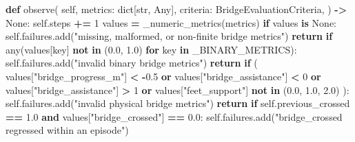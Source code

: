 \documentclass[
  american,
  11pt,
  letterpaper,
]{article}
\newenvironment{Shaded}{\begin{snugshade}}{\end{snugshade}}
\newcommand{\BuiltInTok}[1]{#1}
\newcommand{\ControlFlowTok}[1]{\textcolor[rgb]{0.13,0.29,0.53}{\textbf{#1}}}
\newcommand{\DecValTok}[1]{\textcolor[rgb]{0.00,0.00,0.81}{#1}}
\newcommand{\FloatTok}[1]{\textcolor[rgb]{0.00,0.00,0.81}{#1}}
\newcommand{\KeywordTok}[1]{\textcolor[rgb]{0.13,0.29,0.53}{\textbf{#1}}}
\newcommand{\NormalTok}[1]{#1}
\newcommand{\OperatorTok}[1]{\textcolor[rgb]{0.81,0.36,0.00}{\textbf{#1}}}
\newcommand{\StringTok}[1]{\textcolor[rgb]{0.31,0.60,0.02}{#1}}
\newcommand{\VariableTok}[1]{\textcolor[rgb]{0.00,0.00,0.00}{#1}}
\renewenvironment{Shaded}{\par\smallskip}{\par\smallskip}
\begin{document}
\begin{Shaded}
\begin{Highlighting}[]
    \KeywordTok{def}\NormalTok{ observe(}
        \VariableTok{self}\NormalTok{,}
\NormalTok{        metrics: }\BuiltInTok{dict}\NormalTok{[}\BuiltInTok{str}\NormalTok{, Any],}
\NormalTok{        criteria: BridgeEvaluationCriteria,}
\NormalTok{    ) }\OperatorTok{{-}\textgreater{}} \VariableTok{None}\NormalTok{:}
        \VariableTok{self}\NormalTok{.steps }\OperatorTok{+=} \DecValTok{1}
\NormalTok{        values }\OperatorTok{=}\NormalTok{ \_numeric\_metrics(metrics)}
        \ControlFlowTok{if}\NormalTok{ values }\KeywordTok{is} \VariableTok{None}\NormalTok{:}
            \VariableTok{self}\NormalTok{.failures.add(}\StringTok{"missing, malformed, or non{-}finite bridge metrics"}\NormalTok{)}
            \ControlFlowTok{return}
        \ControlFlowTok{if} \BuiltInTok{any}\NormalTok{(values[key] }\KeywordTok{not} \KeywordTok{in}\NormalTok{ (}\FloatTok{0.0}\NormalTok{, }\FloatTok{1.0}\NormalTok{) }\ControlFlowTok{for}\NormalTok{ key }\KeywordTok{in}\NormalTok{ \_BINARY\_METRICS):}
            \VariableTok{self}\NormalTok{.failures.add(}\StringTok{"invalid binary bridge metrics"}\NormalTok{)}
            \ControlFlowTok{return}
        \ControlFlowTok{if}\NormalTok{ (}
\NormalTok{            values[}\StringTok{"bridge\_progress\_m"}\NormalTok{] }\OperatorTok{\textless{}} \OperatorTok{{-}}\FloatTok{0.5}
            \KeywordTok{or}\NormalTok{ values[}\StringTok{"bridge\_assistance"}\NormalTok{] }\OperatorTok{\textless{}} \DecValTok{0}
            \KeywordTok{or}\NormalTok{ values[}\StringTok{"bridge\_assistance"}\NormalTok{] }\OperatorTok{\textgreater{}} \DecValTok{1}
            \KeywordTok{or}\NormalTok{ values[}\StringTok{"feet\_support"}\NormalTok{] }\KeywordTok{not} \KeywordTok{in}\NormalTok{ (}\FloatTok{0.0}\NormalTok{, }\FloatTok{1.0}\NormalTok{, }\FloatTok{2.0}\NormalTok{)}
\NormalTok{        ):}
            \VariableTok{self}\NormalTok{.failures.add(}\StringTok{"invalid physical bridge metrics"}\NormalTok{)}
            \ControlFlowTok{return}
        \ControlFlowTok{if} \VariableTok{self}\NormalTok{.previous\_crossed }\OperatorTok{==} \FloatTok{1.0} \KeywordTok{and}\NormalTok{ values[}\StringTok{"bridge\_crossed"}\NormalTok{] }\OperatorTok{==} \FloatTok{0.0}\NormalTok{:}
            \VariableTok{self}\NormalTok{.failures.add(}\StringTok{"bridge\_crossed regressed within an episode"}\NormalTok{)}


\end{Highlighting}
\end{Shaded}
\end{document}
